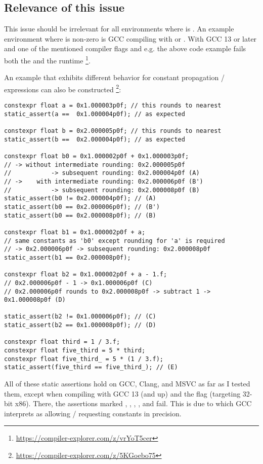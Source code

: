 \subsection{Relevance of this issue}

This issue should be irrelevant for all environments where
 is .
An example environment where  is non-zero is GCC
compiling with  or .
With GCC 13 or later and one of the mentioned compiler flags and e.g.
 the above code example fails both the 
and the runtime \footnote{\url{https://compiler-explorer.com/z/vrYoT5cer}}.

\pagebreak
An example that exhibits different behavior for constant propagation /
expressions can also be constructed%
\footnote{\url{https://compiler-explorer.com/z/5KGoebo75}}:
\begin{lstlisting}
constexpr float a = 0x1.000003p0f; // this rounds to nearest
static_assert(a ==  0x1.000004p0f); // as expected

constexpr float b = 0x2.000005p0f; // this rounds to nearest
static_assert(b ==  0x2.000004p0f); // as expected

constexpr float b0 = 0x1.000002p0f + 0x1.000003p0f;
// -> without intermediate rounding: 0x2.000005p0f
//           -> subsequent rounding: 0x2.000004p0f (A)
// ->    with intermediate rounding: 0x2.000006p0f (B')
//           -> subsequent rounding: 0x2.000008p0f (B)
static_assert(b0 != 0x2.000004p0f); // (A)
static_assert(b0 == 0x2.000006p0f); // (B')
static_assert(b0 == 0x2.000008p0f); // (B)

constexpr float b1 = 0x1.000002p0f + a;
// same constants as 'b0' except rounding for 'a' is required
// -> 0x2.000006p0f -> subsequent rounding: 0x2.000008p0f
static_assert(b1 == 0x2.000008p0f);

constexpr float b2 = 0x1.000002p0f + a - 1.f;
// 0x2.000006p0f - 1 -> 0x1.000006p0f (C)
// 0x2.000006p0f rounds to 0x2.000008p0f -> subtract 1 -> 0x1.000008p0f (D)

static_assert(b2 != 0x1.000006p0f); // (C)
static_assert(b2 == 0x1.000008p0f); // (D)

constexpr float third = 1 / 3.f;
constexpr float five_third = 5 * third;
constexpr float five_third_ = 5 * (1 / 3.f);
static_assert(five_third == five_third_); // (E)
\end{lstlisting}
All of these static assertions hold on GCC, Clang, and MSVC as far as I tested
them, except when compiling with GCC 13 (and up) and the  flag
(targeting 32-bit x86).
There, the assertions marked ,  , ,
, and  fail.
This is due to  which GCC interprets as allowing /
requesting constants in  precision.

